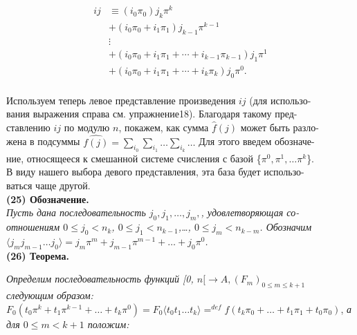 \documentclass{mai_book}
\begin{document}
{\begin{small}
\begin{multicols}{2}
\begin{align*}
ij &\equiv (i_0\pi_0)j_k\pi^k\\
&+ (i_0\pi_0 + i_1\pi_1)j_{k-1}\pi^{k-1}\\
&\vdots\\
&+(i_0\pi_0 + i_1\pi_1 +\cdots+ i_{k-1}\pi_{k-1})j_1\pi^1\\
&+(i_0\pi_0 + i_1\pi_1 +\cdots+ i_k\pi_k)j_0\pi^0.\\
\end{align*}
\end{multicols}
\end{small}
\noindent Используем теперь левое представление произведения $ij$ (для использо-\\ вания выражения справа см. упражнение18). Благодаря такому пред-\\ставлению $ij$ по модулю $n$, покажем, как сумма
$\widehat{f}(j)$ может быть разло-\\жена в подсуммы $\widehat{f(j)} = \sum_{i_0}\sum_{i_1}\dots\sum_{i_k}\dots$ Для этого введем обозначе-\\ние, относящееся к смешанной системе счисления с базой \{$\pi^0,\pi^1,\dots\pi^k$\}.\\В виду нашего выбора девого представления, эта база будет использо-\\ваться чаще другой.\\

\textbf{(25) Обозначение.}\\

\textit{Пусть дана последовательность $j_0,j_1,\dots, j_m,$, удовлетворяющая со-\\отношениям $0\leqslant j_0 < n_k$, $0\leqslant j_1 < n_{k-1}$,\dots, $0\leqslant j_m < n_{k-m}$. Обозначим \\ $\langle {j_m}{j_{m-1}}\dots{j_0} \rangle = j_m\pi^m + j_{m-1}\pi^{m-1} + \dots + j_0\pi^0$.}\\

\textbf{(26) Теорема.}

\textit{Определим последовательность функций [0, $n [\rightarrow A, (F_m)_{0\leqslant m \leqslant k+1}$ \\ следующим образом:}\\
	$F_0(t_0\pi^k + t_1\pi^{k-1} + \dots + t_k\pi^0)= F_0\langle t_0t_1\dots t_k\rangle = ^{def} f(t_k\pi_0+\dots+t_1\pi_1 +t_0\pi_0)$,
\newpage
{}
\textit{а для $0\leq m < k+1$ положим:}\\

}
\end{document}
